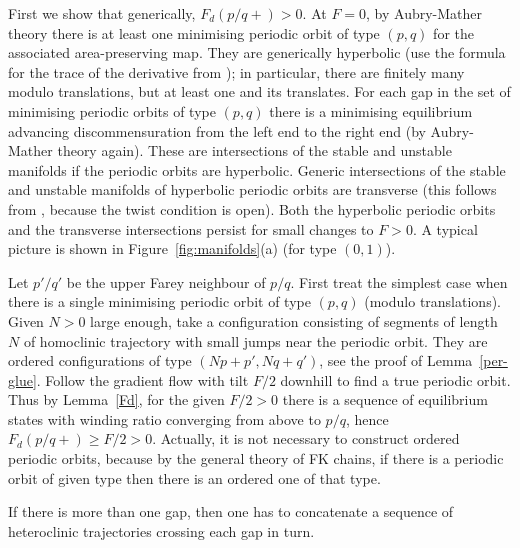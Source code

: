 \documentclass[12pt]{article}
\begin{document}
First we show that generically, $F_d(p/q+)>0$.  At $F=0$, by Aubry-Mather theory there is at least one minimising periodic orbit of type $(p,q)$ for the associated area-preserving map.  They are generically hyperbolic (use the formula for the trace of the derivative from \cite{MM}); in particular, there are finitely many modulo translations, but at least one and its translates.  For each gap in the set of minimising periodic orbits of type $(p,q)$ there is a minimising equilibrium advancing discommensuration from the left end to the right end (by Aubry-Mather theory again).  These are intersections of the stable and unstable manifolds if the periodic orbits are hyperbolic.  Generic intersections of the stable and unstable manifolds of hyperbolic periodic orbits are transverse (this follows from \cite{Rob}, because the twist condition is open).  Both the hyperbolic periodic orbits and the transverse intersections persist for small changes to $F>0$.  A typical picture is shown in Figure~\ref{fig:manifolds}(a) (for type $(0,1)$).

Let $p'/q'$ be the upper Farey neighbour of $p/q$.  First treat the simplest case when there is a single minimising periodic orbit of type $(p,q)$ (modulo translations).  Given $N>0$ large enough, take a configuration consisting of segments of length $N$ of homoclinic trajectory with small jumps near the periodic orbit.  They are ordered configurations of type $(Np+p',Nq+q')$, see the proof of Lemma~\ref{per-glue}.  Follow the gradient flow with tilt $F/2$ downhill to find a true periodic orbit.  Thus by Lemma~\ref{Fd}, for the given $F/2>0$ there is a sequence of equilibrium states with winding ratio converging from above to $p/q$, hence $F_d(p/q+)\ge F/2>0$. Actually, it is not necessary to construct ordered periodic orbits, because by the general theory of FK chains, if there is a periodic orbit of given type then there is an ordered one of that type.

If there is more than one gap, then one has to concatenate a sequence of heteroclinic trajectories crossing each gap in turn.
\end{document}
